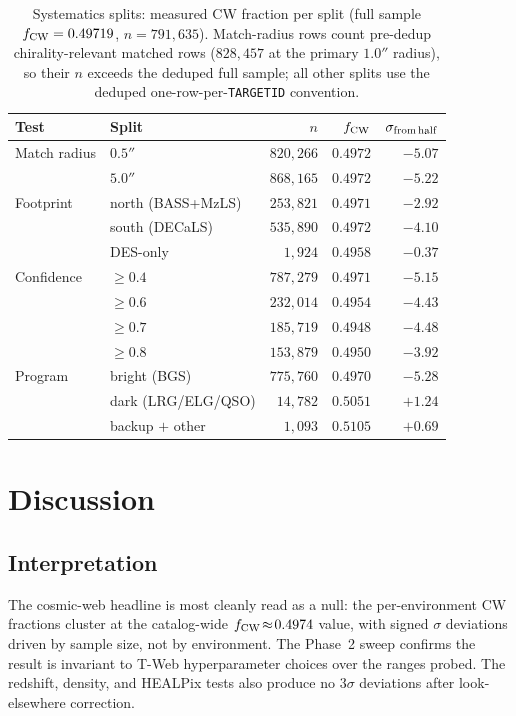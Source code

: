 \documentclass[aps,prd,twocolumn,superscriptaddress,showpacs,preprintnumbers,nofootinbib,longbibliography,floatfix]{revtex4-2}
\begin{document}
\begin{table}[ht]
\caption{Systematics splits: measured CW fraction per split
(full sample $f_{\rm CW} = 0.49719$, $n = 791{,}635$). Match-radius
rows count pre-dedup chirality-relevant matched rows ($828{,}457$ at
the primary $1.0''$ radius), so their $n$ exceeds the deduped full
sample; all other splits use the deduped one-row-per-\texttt{TARGETID}
convention.}
\label{tab:systematics_splits}
\begin{ruledtabular}
\begin{tabular}{llrrr}
Test & Split & $n$ & $f_{\rm CW}$ & $\sigma_{\rm from\,half}$ \\
\hline
Match radius & $0.5''$ & $820{,}266$ & $0.4972$ & $-5.07$ \\
             & $5.0''$ & $868{,}165$ & $0.4972$ & $-5.22$ \\
Footprint & north (BASS+MzLS) & $253{,}821$ & $0.4971$ & $-2.92$ \\
          & south (DECaLS) & $535{,}890$ & $0.4972$ & $-4.10$ \\
          & DES-only & $1{,}924$ & $0.4958$ & $-0.37$ \\
Confidence & $\ge 0.4$ & $787{,}279$ & $0.4971$ & $-5.15$ \\
           & $\ge 0.6$ & $232{,}014$ & $0.4954$ & $-4.43$ \\
           & $\ge 0.7$ & $185{,}719$ & $0.4948$ & $-4.48$ \\
           & $\ge 0.8$ & $153{,}879$ & $0.4950$ & $-3.92$ \\
Program & bright (BGS) & $775{,}760$ & $0.4970$ & $-5.28$ \\
        & dark (LRG/ELG/QSO) & $14{,}782$ & $0.5051$ & $+1.24$ \\
        & backup $+$ other & $1{,}093$ & $0.5105$ & $+0.69$ \\
\end{tabular}
\end{ruledtabular}
\end{table}

\section{Discussion}\label{sec:discussion}

\subsection{Interpretation}

The cosmic-web headline is most cleanly read as a null: the
per-environment CW fractions cluster at the catalog-wide $f_{\rm CW}
\!\approx\! 0.4974$ value, with signed $\sigma$ deviations driven by
sample size, not by environment. The Phase~2 sweep confirms the result
is invariant to T-Web hyperparameter choices over the ranges probed.
The redshift, density, and HEALPix tests also produce no $3\sigma$
deviations after look-elsewhere correction.
\end{document}
